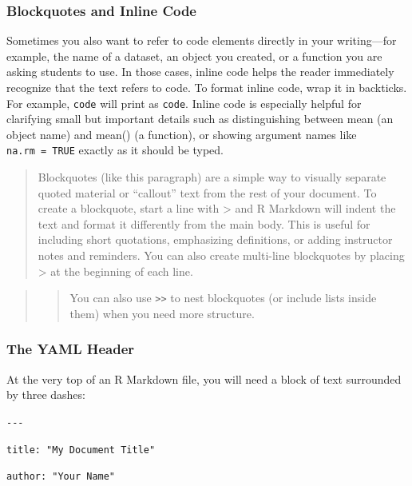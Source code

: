 \documentclass[
  11pt,
]{article}
\begin{document}
\subsubsection{Blockquotes and Inline
Code}\label{blockquotes-and-inline-code}

Sometimes you also want to refer to code elements directly in your
writing---for example, the name of a dataset, an object you created, or
a function you are asking students to use. In those cases, inline code
helps the reader immediately recognize that the text refers to code. To
format inline code, wrap it in backticks. For example,
\texttt{\textasciigrave{}code\textasciigrave{}} will print as
\texttt{code}. Inline code is especially helpful for clarifying small
but important details such as distinguishing between mean (an object
name) and mean() (a function), or showing argument names like
\texttt{na.rm\ =\ TRUE} exactly as it should be typed.

\begin{quote}
Blockquotes (like this paragraph) are a simple way to visually separate
quoted material or ``callout'' text from the rest of your document. To
create a blockquote, start a line with \textgreater{} and R Markdown
will indent the text and format it differently from the main body. This
is useful for including short quotations, emphasizing definitions, or
adding instructor notes and reminders. You can also create multi-line
blockquotes by placing \textgreater{} at the beginning of each line.
\end{quote}

\begin{quote}
\begin{quote}
You can also use \texttt{\textgreater{}\textgreater{}} to nest
blockquotes (or include lists inside them) when you need more structure.
\end{quote}
\end{quote}

\subsubsection{The YAML Header}\label{the-yaml-header}

At the very top of an R Markdown file, you will need a block of text
surrounded by three dashes:

\texttt{-\/-\/-}

\texttt{title:\ "My\ Document\ Title"}

\texttt{author:\ "Your\ Name"}
\end{document}
